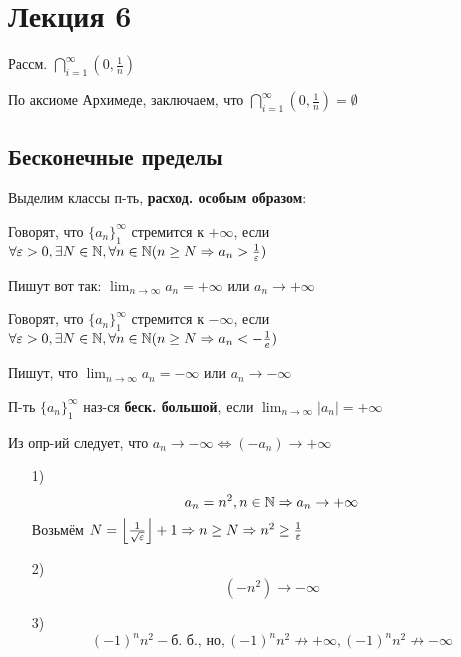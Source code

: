 \section{Лекция 6}

Рассм. $\bigcap_{i = 1}^{\infty} (0, \frac{1}{n})$

По аксиоме Архимеде, заключаем, что $\bigcap_{i = 1}^{\infty} (0, \frac{1}{n}) = \emptyset$

\subsection{Бесконечные пределы}

Выделим классы п-ть, \textbf{расход. особым образом}:
\begin{definition}
Говорят, что $\{a_n\}_{1}^{\infty}$ стремится к $+\infty$, если $\forall \varepsilon > 0, \exists N \in \mathbb{N}, \forall n \in \mathbb{N} (n \geq N \Rightarrow a_n > \frac{1}{\varepsilon})$
\end{definition}
\begin{symb}
Пишут вот так: $\lim_{n\to\infty}a_n = +\infty$ или $a_n \to +\infty$
\end{symb}
\begin{definition}
Говорят, что $\{a_n\}_{1}^{\infty}$ стремится к $-\infty$, если $\forall \varepsilon > 0, \exists N \in \mathbb{N}, \forall n \in \mathbb{N} (n \geq N \Rightarrow a_n < -\frac{1}{e})$
\end{definition}
\begin{symb}
Пишут, что $\lim_{n\to\infty}a_n = -\infty$ или $a_n \to -\infty$
\end{symb}
\begin{definition}
П-ть $\{a_n\}_{1}^{\infty}$ наз-ся \textbf{беск. большой}, если  $\lim_{n\to\infty} \left|a_n\right| = +\infty$
\end{definition}
\begin{note}
Из опр-ий следует, что $a_n \to -\infty \iff (-a_n) \to +\infty$
\end{note}
\begin{example}
  \begin{itemize}
    \item [1) ] \[
a_n = n^{2}, n \in \mathbb{N} \Rightarrow a_n \to +\infty
\]
Возьмём $N = \left\lfloor \frac{1}{\sqrt{\varepsilon}} \right\rfloor + 1 \Rightarrow n \geq N \Rightarrow n^{2} \geq \frac{1}{\varepsilon}$ 

  \item [2) ]
\[
  (-n^{2}) \to -\infty
\]
\item [3) ] \[
    (-1)^{n} n^{2} - \text{б. б., но}, (-1)^{n}n^{2} \not\to +\infty, (-1)^{n}n^{2} \not\to -\infty
\]
  \end{itemize}
\end{example}
